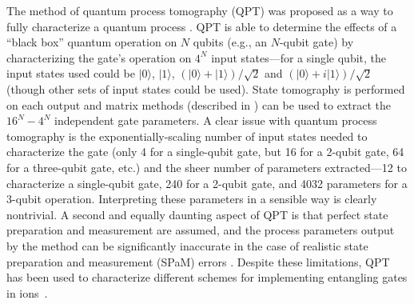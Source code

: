 \documentclass[%
reprint,
 amsmath,amssymb,
]{revtex4-1}
\newcommand{\zero}{|0 \rangle}
\newcommand{\one}{|1 \rangle}
\begin{document}
The method of quantum process tomography (QPT) was proposed as a way to fully characterize a quantum process \cite{ChuangNielsenQPT1997, PoyatosCompleteChar1997}. QPT is able to determine the effects of a ``black box'' quantum operation on $N$ qubits (e.g., an $N$-qubit gate) by characterizing the gate's operation on $4^N$ input states---for a single qubit, the input states used could be $\zero$, $\one$, $(\zero + \one) / \sqrt{2}$ and $(\zero + i \one) / \sqrt{2}$ (though other sets of input states could be used). State tomography is performed on each output and matrix methods (described in \cite{ChuangNielsenQPT1997}) can be used to extract the $16^N - 4^N$ independent gate parameters. A clear issue with quantum process tomography is the exponentially-scaling number of input states needed to characterize the gate (only 4 for a single-qubit gate, but 16 for a 2-qubit gate, 64 for a three-qubit gate, etc.) and the sheer number of parameters extracted---12 to characterize a single-qubit gate, 240 for a 2-qubit gate, and 4032 parameters for a 3-qubit operation. Interpreting these parameters in a sensible way is clearly nontrivial. A second and equally daunting aspect of QPT is that perfect state preparation and measurement are assumed, and the process parameters output by the method can be significantly inaccurate in the case of realistic state preparation and measurement (SPaM) errors \cite{WeinsteinQPT2004}. Despite these limitations, QPT has been used to characterize different schemes for implementing entangling gates in ions~\cite{RiebeProcessTomography2005}.
\end{document}
